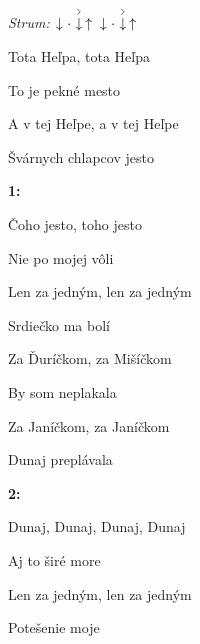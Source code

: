 \begin{song}


\begin{headerbox}
\RaiseBoxWithAccents
{} \quad
\textit{Strum:} $\Down\Miss\AccentDown\Up\ \Down\Miss\AccentDown\Up$
\end{headerbox}

\begin{hchordbox}
\end{hchordbox}

\Large

\bigskip

Tota Heľpa, tota Heľpa \par
{}To je pekné mesto \par
{}A v tej Heľpe, a v tej Heľpe \par
{}Švárnych chlapcov jesto\par

\bigskip

\Refren\textbf{ 1:}  \par
{}Čoho jesto, toho jesto \par
{}Nie po mojej vôli \par
{}Len za jedným, len za jedným \par
{}Srdiečko ma bolí \par

\bigskip

Za Ďuríčkom, za Mišíčkom \par
{}By som neplakala \par
{}Za Janíčkom, za Janíčkom \par
{}Dunaj preplávala \par

\bigskip

\Refren\textbf{ 2:}  \par
{}Dunaj, Dunaj, Dunaj, Dunaj \par
{}Aj to širé more \par
{}Len za jedným, len za jedným \par
{}Potešenie moje \par

\end{song}